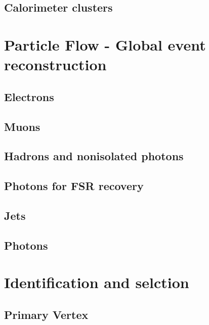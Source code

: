 \subsection{Calorimeter clusters}


\section{Particle Flow - Global event reconstruction}
\label{sec:ParticleFlow}


\subsection{Electrons}
\todo{}
\subsection{Muons}
\todo{}
\subsection{Hadrons and nonisolated photons}
\todo{}

\subsection{Photons for FSR recovery}
\label{sec:FSRphotons}


\subsection{Jets}
\label{sec:jets}


\subsection{Photons}
\label{sec:photons}


\section{Identification and selction}
\subsection{Primary Vertex}


